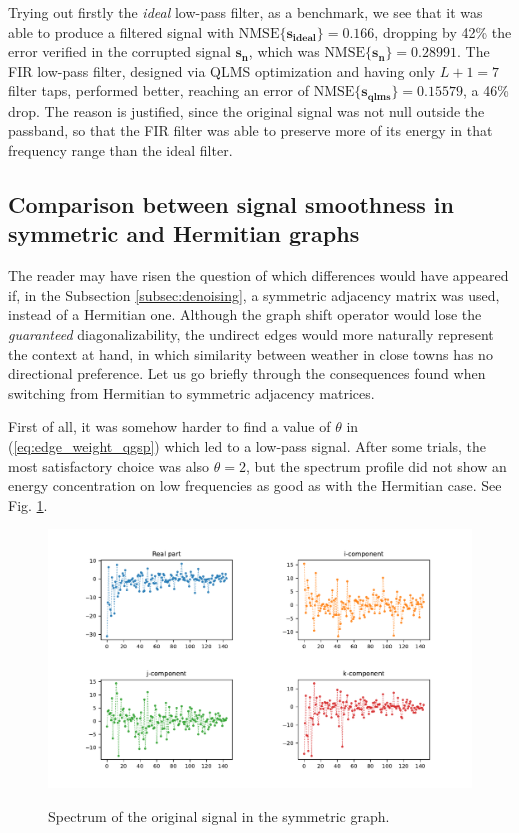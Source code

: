 Trying out firstly the \textit{ideal} low-pass filter, as a benchmark, we see that it was able to produce a filtered signal with $\text{NMSE}\{ \mathbf{s_{ideal}} \} = 0.166$, dropping by 42\% the error verified in the corrupted signal $\mathbf{s_n}$, which was $\text{NMSE}\{ \mathbf{s_n} \} = 0.28991$. The FIR low-pass filter, designed via QLMS optimization and having only $L+1 = 7$ filter taps, performed better, reaching an error of $\text{NMSE}\{ \mathbf{s_{qlms}} \} = 0.15579$, a 46\% drop. The reason is justified, since the original signal was not null outside the passband, so that the FIR filter was able to preserve more of its energy in that frequency range than the ideal filter.

\subsection{Comparison between signal smoothness in symmetric and Hermitian graphs}

The reader may have risen the question of which differences would have appeared if, in the Subsection \ref{subsec:denoising}, a symmetric adjacency matrix was used, instead of a Hermitian one. Although the graph shift operator would lose the \textit{guaranteed} diagonalizability, the undirect edges would more naturally represent the context at hand, in which similarity between weather in close towns has no directional preference. Let us go briefly through the consequences found when switching from Hermitian to symmetric adjacency matrices.

First of all, it was somehow harder to find a value of $\theta$ in (\ref{eq:edge_weight_qgsp}) which led to a low-pass signal. After some trials, the most satisfactory choice was also $\theta = 2$, but the spectrum profile did not show an energy concentration on low frequencies as good as with the Hermitian case. See Fig. \ref{fig:uk_spectrum_symmetric}.

\begin{figure}
    \centering
    \caption{Spectrum of the original signal in the symmetric graph.}
    \includegraphics[width=\linewidth]{Figures/uk_example/uk_spectrum_symmetric.pdf}
    \floatsource
    \label{fig:uk_spectrum_symmetric}
\end{figure}

